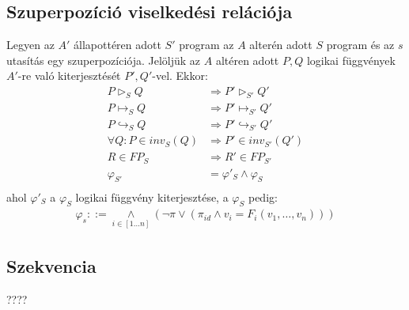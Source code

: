 \documentclass{article}
\begin{document}
\subsection*{Szuperpozíció viselkedési relációja}
Legyen az $A'$ állapottéren adott $S'$ program az $A$ alterén adott $S$ program és az $s$
utasítás egy szuperpozíciója. Jelöljük az $A$ altéren adott $P,Q$ logikai függvények $A'$-re való kiterjesztését $P',Q'$-vel. Ekkor:
\begin{align*}
P \triangleright_S Q &\Rightarrow P' \triangleright_{S'} Q'\\
P \mapsto_S Q &\Rightarrow P' \mapsto_{S'} Q'\\
P \hookrightarrow_S Q &\Rightarrow P' \hookrightarrow_{S'} Q'\\
\forall Q:P \in inv_S(Q) &\Rightarrow P' \in inv_{S'}(Q')\\
R \in FP_S &\Rightarrow R' \in FP_{S'}\\
\varphi_{S'} &= \varphi'_S \land \varphi_S\\
\end{align*}
ahol $\varphi'_S$ a $\varphi_S$ logikai függvény kiterjesztése, a $\varphi_S$ pedig:
\begin{align*}
\varphi_s ::= \underset{i\in [1\dots n]}{\land}(\neg \pi \lor (\pi_{id} \land v_i = F_i(v_1,\dots,v_n)))
\end{align*}
\subsection*{Szekvencia}
????
\end{document}
